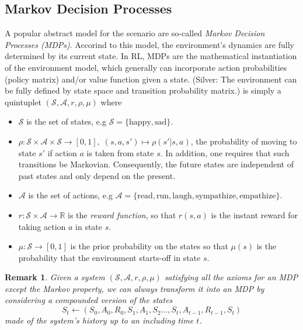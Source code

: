 \documentclass{article} %
\newtheorem{remark}{Remark}
\begin{document}
\subsection{Markov Decision Processes}
A popular abstract model for the scenario are so-called \textit{Markov Decision Processes (MDPs)}.
Accorind to this model, the environment’s dynamics are fully determined by
its current state.
In RL, MDPs are the mathematical instantiation of the environment model,
which generally can incorporate action probabilities (policy matrix)
and/or value function given a state.
(Silver: The environment can be fully defined by state space and
transition probability matrix.)
is simply a quintuplet $(\mathcal S, \mathcal A, r, \rho, \mu)$ where
\begin{itemize}
\item $\mathcal S$ is the set of states, e.g $\mathcal S = \{\text{happy}, \text{sad}\}$.
\item $\rho : \mathcal S \times \mathcal A \times \mathcal S \rightarrow [0, 1],\; (s,a,s') \mapsto \rho(s'|s,a)$,
  the probability of moving to state $s'$ if action $a$ is taken from state $s$. In addition, one requires that such
  transitions be Markovian. Consequently, the future states are independent of past states and only depend on the present.
\item $\mathcal A$ is the set of actions, e.g $\mathcal A = \{\text{read}, \text{run},
  \text{laugh}, \text{sympathize}, \text{empathize}\}.$
\item $r : \mathcal S \times \mathcal A \rightarrow \mathbb R$ is the \textit{reward function},
  so that $r(s, a)$ is the instant reward for taking action $a$ in state $s$.
\item $\mu: \mathcal S \rightarrow [0, 1]$ is the prior probability on the states so that
  $\mu(s)$ is the probability that the environment starts-off in state $s$.
\end{itemize}

\begin{remark}
  Given a system $(\mathcal S, \mathcal A, r, \rho, \mu)$ satisfying all the axioms for an MDP
  except the Markov property, we can always transform it into an MDP by considering a compounded
  version of the states
  $$S_t \leftarrow (S_0,A_0,R_0,S_1,A_1,S_2\ldots,S_t,A_{t-1},R_{t-1},S_{t})$$ made of the system's
  history up to an including time $t$.
\end{remark}
\end{document}
